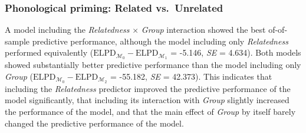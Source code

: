 \documentclass[
  letterpaper,
  DIV=11,
  numbers=noendperiod]{scrartcl}
\begin{document}
\hypertarget{phonological-priming-related-vs.-unrelated}{%
\subsubsection{Phonological priming: Related
vs.~Unrelated}\label{phonological-priming-related-vs.-unrelated}}

A model including the \emph{Relatedness} \(\times\) \emph{Group}
interaction showed the best of-of-sample predictive performance,
although the model including only \emph{Relatedness} performed
equivalently
(\(\text{ELPD}_{\mathcal{M_0}} - \text{ELPD}_{\mathcal{M_1}}\) = -5.146,
\emph{SE} = 4.634). Both models showed substantially better predictive
performance than the model including only \emph{Group}
(\(\text{ELPD}_{\mathcal{M_0}} - \text{ELPD}_{\mathcal{M_2}}\) =
-55.182, \emph{SE} = 42.373). This indicates that including the
\emph{Relatedness} predictor improved the predictive performance of the
model significantly, that including its interaction with \emph{Group}
slightly increased the performance of the model, and that the main
effect of \emph{Group} by itself barely changed the predictive
performance of the model.
\end{document}
